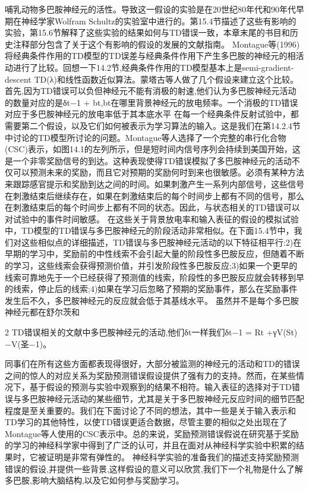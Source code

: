 哺乳动物多巴胺神经元的活性。导致这一假设的实验是在20世纪80年代和90年代早期在神经学家Wolfram Schultz的实验室中进行的。第15.4节描述了这些有影响的实验，第15.6节解释了这些实验的结果如何与TD错误一致，本章末尾的书目和历史注释部分包含了关于这个有影响的假设的发展的文献指南。
Montague等(1996)将经典条件作用的TD模型的TD误差与经典条件作用下产生多巴胺的神经元的相活动进行了比较。回想一下14.2节,经典条件作用的TD模型基本上是semi-gradient-descent TD(λ)和线性函数近似算法。蒙塔古等人做了几个假设来建立这个比较。首先,因为TD错误可以负但神经元不能有消极的射速,他们认为多巴胺神经元活动的数量对应的是δt−1 + bt,bt在哪里背景神经元的放电频率。一个消极的TD错误对应于多巴胺神经元的放电率低于其本底水平
在每一个经典条件反射试验中，都需要第二个假设，以及它们如何被表示为学习算法的输入。这是我们在第14.2.4节中讨论的TD模型所讨论的问题。Montague等人选择了一个完整的串行化合物(CSC)表示，如图14.1的左列所示，但是短时间内信号序列会持续到美国开始，这是一个非零奖励信号的到达。这种表现使得TD错误模拟了多巴胺神经元的活动不仅可以预测未来的奖励，而且它对预期的奖励何时到来也很敏感。必须有某种方法来跟踪感官提示和奖励到达之间的时间。如果刺激产生一系列内部信号，这些信号在刺激结束后继续存在，如果在刺激结束后的每个时间步上都有不同的信号，那么在刺激结束后的每个时间步上都有不同的状态。因此，与状态相关的TD错误可以对试验中的事件时间敏感。
在这些关于背景放电率和输入表征的假设的模拟试验中，TD模型的TD错误与多巴胺神经元的阶段活动非常相似。在下面15.4节中，我们对这些相似点的详细描述，TD错误与多巴胺神经元活动的以下特征相平行:2)在早期的学习中，奖励前的中性线索不会引起大量的阶段性多巴胺反应，但随着不断的学习，这些线索会获得预测价值，并引发阶段性多巴胺反应;3)如果一个更早的线索可靠地先于一个已经获得了预测值的线索，阶段性的多巴胺反应就会转移到早的线索，停止后的线索;4)如果在学习后忽略了预期的奖励事件，那么在奖励事件发生后不久，多巴胺神经元的反应就会低于其基线水平。
虽然并不是每个多巴胺神经元都在舒尔茨和

2 TD错误相关的文献中多巴胺神经元的活动,他们δt一样我们δt−1 = Rt +γV(St)−V(圣−1)。

同事们在所有这些方面都表现得很好，大部分被监测的神经元的活动和TD的错误之间的惊人的对应关系为奖励预测错误假设提供了强有力的支持。然而，在某些情况下，基于假设的预测与实验中观察到的结果不相符。输入表征的选择对于TD错误与多巴胺神经元活动的某些细节，尤其是关于多巴胺神经元反应时间的细节匹配程度是至关重要的。我们在下面讨论了不同的想法，其中一些是关于输入表示和TD学习的其他特性，以使TD错误更适合数据，尽管主要的相似之处出现在了Montague等人使用的CSC表示中。总的来说，奖励预测错误假说在研究基于奖励的学习的神经科学家中得到了广泛的认可，并且在面对从神经科学实验中积累的结果时，它被证明是非常有弹性的。
神经科学实验的准备我们的描述支持奖励预测错误的假设,并提供一些背景,这样假设的意义可以欣赏,我们下一个礼物是什么了解多巴胺,影响大脑结构,以及它如何参与奖励学习。


